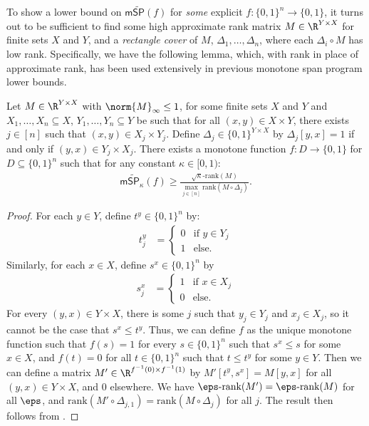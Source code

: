 \documentclass{toc}
\begin{document}
To show a lower bound on $\mathsf{m}\widetilde{\mathsf{SP}}(f)$ for \emph{some} explicit $f:\{0,1\}^n\rightarrow\{0,1\}$, it turns out to be sufficient to find some high approximate rank matrix $M\in\R^{Y\times X}$ for finite sets $X$ and $Y$, and a \emph{rectangle cover} of $M$, $\Delta_1,\dots,\Delta_n$, where each $\Delta_i\circ M$ has low rank. 
Specifically, we have the following lemma, which, with rank in place of approximate rank, has been used extensively in previous monotone span program lower bounds. 

\begin{lemma}\label{lem:matrix-to-f}
Let $M\in\R^{Y\times X}$ with $\norm{M}_\infty\leq 1$, for some finite sets $X$ and $Y$ and $X_1,\dots,X_n\subseteq X$, $Y_1,\dots, Y_n\subseteq Y$ be such that for all $(x,y)\in X\times Y$, there exists $j\in [n]$ such that $(x,y)\in X_j\times Y_j$. Define $\Delta_j\in\{0,1\}^{Y\times X}$ by $\Delta_j[y,x]=1$ if and only if $(y,x)\in Y_j\times X_j$. There exists a monotone function $f:D\rightarrow\{0,1\}$ for $D\subseteq\{0,1\}^n$ such that for any constant $\kappa\in [0,1)$:
\begin{align*}
\mathsf{m}\widetilde{\mathsf{SP}}_\kappa(f)\geq \frac{\sqrt{\kappa}\mbox{-}\mathrm{rank}(M)}{\max_{j\in [n]}\mathrm{rank}(M\circ\Delta_j)}.
\end{align*}
\end{lemma}
\begin{proof}
For each $y\in Y$, define $t^y\in\{0,1\}^n$ by:
\begin{align*}
t^y_j &=\left\{\begin{array}{ll}
0 & \mbox{if }y\in Y_j\\
1 & \mbox{else.}
\end{array}\right.
\end{align*}
Similarly, for each $x\in X$, define $s^x\in\{0,1\}^n$ 
by %
\begin{align*}
s^x_j &=\left\{\begin{array}{ll}
1 & \mbox{if }x\in X_j\\
0 & \mbox{else.}
\end{array}\right.
\end{align*}
For every $(y,x)\in Y\times X$, there is some $j$ such that $y_j\in Y_j$ and $x_j\in X_j$, so it %
cannot  %
be the case that $s^x\leq t^y$. Thus, we can define $f$ as the unique monotone function such that $f(s)=1$ for every $s\in\{0,1\}^n$ such that $s^x\leq s$ for some $x\in X$, and $f(t)=0$ for all $t\in\{0,1\}^n$ such that $t\leq t^y$ for some $y\in Y$. Then we can define a matrix $M'\in\R^{f^{-1}(0)\times f^{-1}(1)}$ by $M'[t^y,s^x]=M[y,x]$ for all $(y,x)\in Y\times X$, and 0 elsewhere. We have $\eps\mbox{-rank}(M')=\eps\mbox{-rank}(M)$ for all $\eps$, and $\mathrm{rank}(M'\circ\Delta_{j,1})=\mathrm{rank}(M\circ\Delta_j)$ for all $j$. The result then follows from .
\end{proof}
\end{document}

